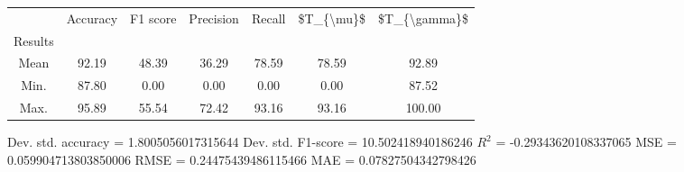 \begin{tabular}{|c|c|c|c|c|c|c|}
\toprule
{} &  Accuracy &  F1 score &  Precision &  Recall &  \$T\_\{\textbackslash mu\}\$ &  \$T\_\{\textbackslash gamma\}\$ \\
Results &           &           &            &         &            &               \\
\hline
Mean    &     92.19 &     48.39 &      36.29 &   78.59 &      78.59 &         92.89 \\
Min.    &     87.80 &      0.00 &       0.00 &    0.00 &       0.00 &         87.52 \\
Max.    &     95.89 &     55.54 &      72.42 &   93.16 &      93.16 &        100.00 \\
\bottomrule
\end{tabular}

 Dev. std. accuracy = 1.8005056017315644
 Dev. std. F1-score = 10.502418940186246
 $R^2$ = -0.29343620108337065
 MSE = 0.059904713803850006
 RMSE = 0.24475439486115466
 MAE = 0.07827504342798426